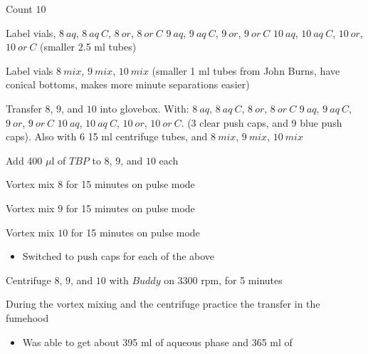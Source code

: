 \documentclass[idxtotoc,hyperref,openany,oneside]{labbook} %
\newcommand{\cmark}{\ding{51}}%
\newcommand{\done}{\rlap{$\square$}{\raisebox{2pt}{\large\hspace{1pt}\cmark}}%
  \hspace{-2.5pt}}
\begin{document}




\begin{todolist}
\item[\done]{Count $\boxed{10}$}
\item[\done]{Label vials,
  $\boxed{8\ aq}$,  $\boxed{8\ aq\ C}$,  $\boxed{8\ or}$,
  $\boxed{8\ or\ C}$
  $\boxed{9\ aq}$,  $\boxed{9\ aq\ C}$,  $\boxed{9\ or}$,
  $\boxed{9\ or\ C}$
  $\boxed{10\ aq}$, $\boxed{10\ aq\ C}$, $\boxed{10\ or}$,
  $\boxed{10\ or\ C}$ (smaller 2.5 ml tubes)}
\item[\done]{Label vials $\boxed{8\ mix}$, $\boxed{9\ mix}$,
  $\boxed{10\ mix}$ (smaller 1 ml tubes from John Burns,
  have conical bottoms, makes more minute separations easier)}
\item[\done]{Transfer $\boxed{8}$, $\boxed{9}$, and $\boxed{10}$
  into glovebox. With:
  $\boxed{8\ aq}$,  $\boxed{8\ aq\ C}$,  $\boxed{8\ or}$,
  $\boxed{8\ or\ C}$
  $\boxed{9\ aq}$,  $\boxed{9\ aq\ C}$,  $\boxed{9\ or}$,
  $\boxed{9\ or\ C}$
  $\boxed{10\ aq}$, $\boxed{10\ aq\ C}$, $\boxed{10\ or}$,
  $\boxed{10\ or\ C}$.
  (3 clear push caps, and 9 blue
  push caps). Also with 6 15 ml centrifuge tubes,
  and $\boxed{8\ mix}$, $\boxed{9\ mix}$,
  $\boxed{10\ mix}$}
\item[\done]{Add 400 $\mu$l of $\boxed{TBP}$ to $\boxed{8}$, $\boxed{9}$, and $\boxed{10}$ each}
\item[\done]{Vortex mix $\boxed{8}$ for 15 minutes on pulse mode}
\item[\done]{Vortex mix $\boxed{9}$ for 15 minutes on pulse mode}
\item[\done]{Vortex mix $\boxed{10}$ for 15 minutes on pulse mode}
  \begin{itemize}
  \item{Switched to push caps for each of the above}
  \end{itemize}
\item[\done]{Centrifuge $\boxed{8}$, $\boxed{9}$, and $\boxed{10}$
  with $\boxed{Buddy}$ on 3300 rpm, for 5 minutes}
\item[\done]{During the vortex mixing and the centrifuge
  practice the transfer in the fumehood}
  \begin{itemize}
  \item{Was able to get about 395 ml of aqueous phase and 365 ml of
}
\end{itemize}
\end{todolist}
\end{document}
